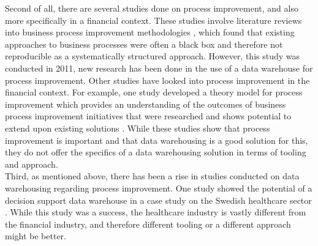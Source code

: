 \documentclass[11pt]{article}
\begin{document}
Second of all, there are several studies done on process improvement, and also more specifically in a financial context. These studies involve literature reviews into business process improvement methodologies \cite{zellner2011structured}, which found that existing approaches to business processes were often a black box and therefore not reproducible as a systematically structured approach. However, this study was conducted in 2011, new research has been done in the use of a data warehouse for process improvement. Other studies have looked into process improvement in the financial context. For example, one study developed a theory model for process improvement which provides an understanding of the outcomes of business process improvement initiatives that were researched and shows potential to extend upon existing solutions \cite{buavaraporn2013business}. While these studies show that process improvement is important and that data warehousing is a good solution for this, they do not offer the specifics of a data warehousing solution in terms of tooling and approach. \\

Third, as mentioned above, there has been a rise in studies conducted on data warehousing regarding process improvement. One study showed the potential of a decision support data warehouse in a case study on the Swedish healthcare sector \cite{shahzad2009goal}. While this study was a success, the healthcare industry is vastly different from the financial industry, and therefore different tooling or a different approach might be better. \\
\end{document}
